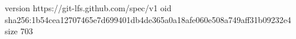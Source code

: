version https://git-lfs.github.com/spec/v1
oid sha256:1b54cea12707465e7d699401db4de365a0a18afe060e508a749aff31b09232e4
size 703
